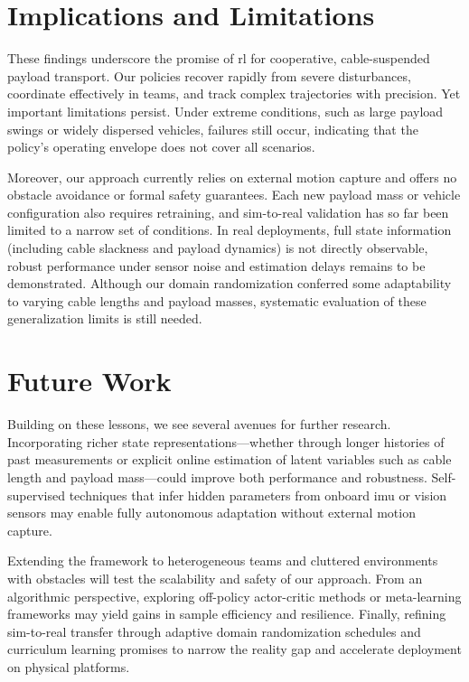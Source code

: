 \section{Implications and Limitations}

These findings underscore the promise of \gls{rl} for cooperative, cable-suspended payload transport.  Our policies recover rapidly from severe disturbances, coordinate effectively in teams, and track complex trajectories with precision.  Yet important limitations persist.  Under extreme conditions, such as large payload swings or widely dispersed vehicles, failures still occur, indicating that the policy's operating envelope does not cover all scenarios.

Moreover, our approach currently relies on external motion capture and offers no obstacle avoidance or formal safety guarantees.  Each new payload mass or vehicle configuration also requires retraining, and sim-to-real validation has so far been limited to a narrow set of conditions.   In real deployments, full state information (including cable slackness and payload dynamics) is not directly observable, robust performance under sensor noise and estimation delays remains to be demonstrated.  Although our domain randomization conferred some adaptability to varying cable lengths and payload masses, systematic evaluation of these generalization limits is still needed.
\section{Future Work}

Building on these lessons, we see several avenues for further research.  Incorporating richer state representations—whether through longer histories of past measurements or explicit online estimation of latent variables such as cable length and payload mass—could improve both performance and robustness.  Self-supervised techniques that infer hidden parameters from onboard \gls{imu} or vision sensors may enable fully autonomous adaptation without external motion capture.

Extending the framework to heterogeneous teams and cluttered environments with obstacles will test the scalability and safety of our approach.  From an algorithmic perspective, exploring off-policy actor-critic methods or meta-learning frameworks may yield gains in sample efficiency and resilience.  Finally, refining sim-to-real transfer through adaptive domain randomization schedules and curriculum learning promises to narrow the reality gap and accelerate deployment on physical platforms.


